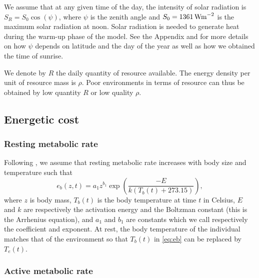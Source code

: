 We assume that at any given time of the day, the intensity of solar radiation is $S_R = S_0 \cos(\psi)$,
where $\psi$ is the zenith angle and $S_0 = 1361 \, \rm{W m}^{-2}$ is the maximum solar radiation at noon.
Solar radiation is needed to generate heat during the warm-up phase of the model.
See the Appendix and \citet{Campbell2012} for more details on how $\psi$ depends on latitude and the day of the year as well as how we obtained the time of sunrise.

We denote by $R$ the daily quantity of resource available.
The energy density per unit of resource mass is $\rho$.
Poor environments in terms of resource can thus be obtained by low quantity $R$ or low quality $\rho$.

\subsection*{Energetic cost}

\subsubsection*{Resting metabolic rate}

Following \citet{Brown2004}, we assume that resting metabolic rate increases with body size and temperature such that
\begin{equation} \label{eq:eb}
	e_b(z, t) = a_1 z^{b_1} \exp \left(\frac{-E}{k (T_b(t)+ 273.15)}\right),
\end{equation}
where $z$ is body mass, $T_b(t)$ is the body temperature at time $t$ in Celsius, $E$ and $k$ are respectively the activation energy and the Boltzman constant (this is the Arrhenius equation), and $a_1$ and $b_1$ are constants which we call respectively the coefficient and exponent.
At rest, the body temperature of the individual matches that of the environment \citep[e.g.,][]{Bartholomew1978} so that $T_b(t)$ in \cref{eq:eb} can be replaced by $T_e(t)$.

\subsubsection*{Active metabolic rate}

